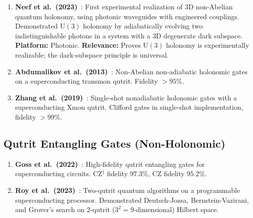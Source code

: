 \documentclass[11pt,letterpaper]{article}
\newcommand{\UU}{\mathrm{U}}
\begin{document}
\begin{enumerate}[label=(\alph*)]
  \item \textbf{Neef et al.\ (2023)}~\cite{Neef2023}: First experimental realization %
    of 3D non-Abelian quantum holonomy, using photonic waveguides with engineered
    couplings. Demonstrated $\UU(3)$ holonomy by adiabatically evolving two
    indistinguishable photons in a system with a 3D degenerate dark subspace.
    \textbf{Platform:} Photonic. \textbf{Relevance:} Proves $\UU(3)$ holonomy is
    experimentally realizable; the dark-subspace principle is universal.

  \item \textbf{Abdumalikov et al.\ (2013)}~\cite{Abdumalikov2013}: Non-Abelian
    non-adiabatic holonomic gates on a superconducting transmon qutrit. Fidelity
    $> 95\%$. %

  \item \textbf{Zhang et al.\ (2019)}~\cite{Zhang2019}: Single-shot nonadiabatic holonomic
    gates with a superconducting Xmon qutrit. Clifford gates in single-shot
    implementation, fidelity $> 99\%$. %
\end{enumerate}

\subsection{Qutrit Entangling Gates (Non-Holonomic)}

\begin{enumerate}[label=(\alph*)]
  \item \textbf{Goss et al.\ (2022)}~\cite{Goss2022}: High-fidelity qutrit entangling
    gates for superconducting circuits. CZ$^\dagger$ fidelity $97.3\%$, CZ fidelity
    $95.2\%$. %

  \item \textbf{Roy et al.\ (2023)}~\cite{Roy2023}: Two-qutrit quantum algorithms on
    a programmable superconducting processor. Demonstrated Deutsch-Jozsa, Bernstein-Vazirani,
    and Grover's search on 2-qutrit ($3^2 = 9$-dimensional) Hilbert space. %
\end{enumerate}
\end{document}
